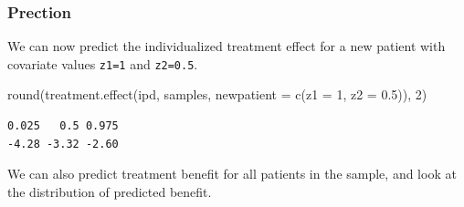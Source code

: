 \documentclass[
  letterpaper,
  DIV=11,
  numbers=noendperiod]{scrreprt}
\newenvironment{Shaded}{\begin{snugshade}}{\end{snugshade}}
\newcommand{\AttributeTok}[1]{\textcolor[rgb]{0.40,0.45,0.13}{#1}}
\newcommand{\ConstantTok}[1]{\textcolor[rgb]{0.56,0.35,0.01}{#1}}
\newcommand{\ControlFlowTok}[1]{\textcolor[rgb]{0.00,0.23,0.31}{#1}}
\newcommand{\DecValTok}[1]{\textcolor[rgb]{0.68,0.00,0.00}{#1}}
\newcommand{\FloatTok}[1]{\textcolor[rgb]{0.68,0.00,0.00}{#1}}
\newcommand{\FunctionTok}[1]{\textcolor[rgb]{0.28,0.35,0.67}{#1}}
\newcommand{\NormalTok}[1]{\textcolor[rgb]{0.00,0.23,0.31}{#1}}
\newcommand{\OtherTok}[1]{\textcolor[rgb]{0.00,0.23,0.31}{#1}}
\newcommand{\SpecialCharTok}[1]{\textcolor[rgb]{0.37,0.37,0.37}{#1}}
\newcommand{\StringTok}[1]{\textcolor[rgb]{0.13,0.47,0.30}{#1}}
\begin{document}
\hypertarget{prection}{%
\subsubsection{Prection}\label{prection}}

We can now predict the individualized treatment effect for a new patient
with covariate values \texttt{z1=1} and \texttt{z2=0.5}.

\begin{Shaded}
\begin{Highlighting}[]
\FunctionTok{round}\NormalTok{(}\FunctionTok{treatment.effect}\NormalTok{(ipd, samples, }\AttributeTok{newpatient =} \FunctionTok{c}\NormalTok{(}\AttributeTok{z1 =} \DecValTok{1}\NormalTok{, }\AttributeTok{z2 =} \FloatTok{0.5}\NormalTok{)), }\DecValTok{2}\NormalTok{)}
\end{Highlighting}
\end{Shaded}

\begin{verbatim}
0.025   0.5 0.975 
-4.28 -3.32 -2.60 
\end{verbatim}

We can also predict treatment benefit for all patients in the sample,
and look at the distribution of predicted benefit.

\begin{Shaded}
\end{Shaded}
\end{document}
